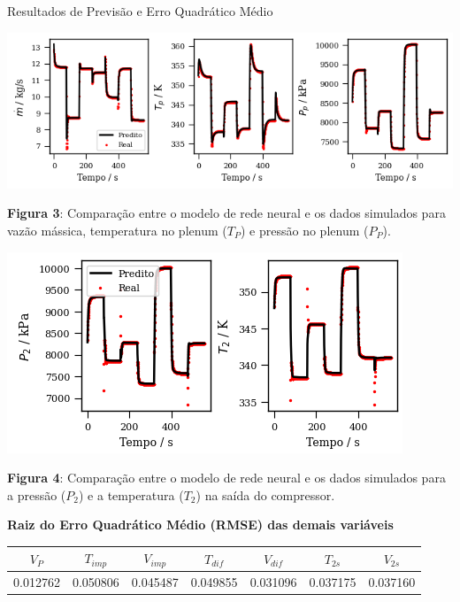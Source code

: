 \begin{frame}{Resultados de Previsão e Erro Quadrático Médio}
\scriptsize

\begin{center}
\setlength{\fboxsep}{0pt}%
\begin{minipage}[t]{0.49\textwidth}
    \centering
    \includegraphics[width=1.05\linewidth, height=0.40\textheight, keepaspectratio]{figures/plot_1.png}
    \vspace{0.1cm}
    {\tiny\parbox{\linewidth}{\centering \textbf{Figura 3}: Comparação entre o modelo de rede neural e os dados simulados para vazão mássica, temperatura no plenum ($T_P$) e pressão no plenum ($P_P$).}}
\end{minipage}\hfill
\begin{minipage}[t]{0.49\textwidth}
    \centering
    \includegraphics[width=1.1\linewidth, height=0.4\textheight, keepaspectratio]{figures/plot_2.png}
    \vspace{0.1cm}
    {\tiny\parbox{\linewidth}{\centering \textbf{Figura 4}: Comparação entre o modelo de rede neural e os dados simulados para a pressão ($P_2$) e a temperatura ($T_2$) na saída do compressor.}}
\end{minipage}
\end{center}

\vspace{0.2cm}

\centering
\textbf{Raiz do Erro Quadrático Médio (RMSE) das demais variáveis} \\[0.2cm]

\begin{tabular}{@{}ccccccc@{}}
\toprule
$V_P$ & $T_{imp}$ & $V_{imp}$ & $T_{dif}$ & $V_{dif}$ & $T_{2s}$ & $V_{2s}$ \\
\midrule
0.012762 & 0.050806 & 0.045487 & 0.049855 & 0.031096 & 0.037175 & 0.037160 \\
\bottomrule
\end{tabular}

\end{frame}

